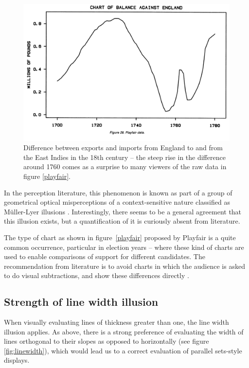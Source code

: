 \documentclass[journal]{vgtc}\usepackage{graphicx, color}
\begin{document}
\begin{figure}
\centering
\includegraphics[width=.8\linewidth, height=.4\linewidth]{images/playfair_differenz_cleveland}
\caption{\label{playfair2}
Difference between exports and imports from England to and from the East Indies in the 18th century -- the steep rise in the difference around 1760  comes as a surprise to many viewers of the raw data in figure \ref{playfair}.  }
\end{figure}




In the perception literature, this phenomenon is known as part of a group of geometrical optical misperceptions of a context-sensitive nature classified as M\"uller-Lyer illusions \citep{day:1991, goldstein}. Interestingly, there seems to be a general agreement that this illusion exists, but a quantification of it is curiously absent from literature. 

The type of chart as shown in figure~\ref{playfair} proposed by Playfair is a quite common occurrence, particular in election years -- where these kind of charts are used to enable comparisons of support for different candidates. The recommendation from literature is to avoid charts in which the audience is asked to do visual subtractions, and show these differences directly \citep{cleveland:1984, wainer:2000, tufte}.

\subsection{Strength of  line width illusion}\label{distortion}

When visually evaluating lines of thickness greater than one, the line width illusion applies. %
As above, there is a strong preference of evaluating the width of lines orthogonal to their slopes as opposed to horizontally (see figure \ref{fig:linewidth}), which would lead us to a correct  evaluation of parallel sets-style displays.
\end{document}
